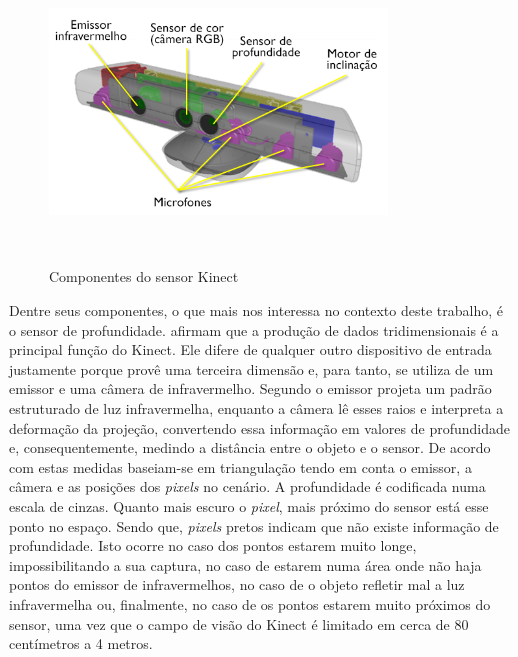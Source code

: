 \begin{figure}[H]
  \begin{center}
    \caption{Componentes do sensor Kinect}
    \vspace*{0,2cm}
    \includegraphics[width=0.8\textwidth]{./04-figuras/kinect_componentes}
    \label{fig:kinect_componentes}
  \end{center}
  \vspace*{-0,9cm}
  \\
\end{figure}

Dentre seus componentes, o que mais nos interessa no contexto deste trabalho, é o sensor de profundidade.  afirmam que a produção de dados tridimensionais é a principal função do Kinect. Ele difere de qualquer outro dispositivo de entrada justamente porque provê uma terceira dimensão e, para tanto, se utiliza de um emissor e uma câmera de infravermelho. Segundo  o emissor projeta um padrão estruturado de luz infravermelha, enquanto a câmera lê esses raios e interpreta a deformação da projeção, convertendo essa informação em valores de profundidade e, consequentemente, medindo a distância entre o objeto e o sensor. De acordo com  estas medidas baseiam-se em triangulação tendo em conta o emissor, a câmera e as posições dos \textit{pixels} no cenário. A profundidade é codificada numa escala de cinzas. Quanto mais escuro o \textit{pixel}, mais próximo do sensor está esse ponto no espaço. Sendo que, \textit{pixels} pretos indicam que não existe informação de profundidade. Isto ocorre no caso dos pontos estarem muito longe, impossibilitando a sua captura, no caso de estarem numa área onde não haja pontos do emissor de infravermelhos, no caso de o objeto refletir mal a luz infravermelha ou, finalmente, no caso de os pontos estarem muito próximos do sensor, uma vez que o campo de visão do Kinect é limitado em cerca de 80 centímetros a 4 metros.

